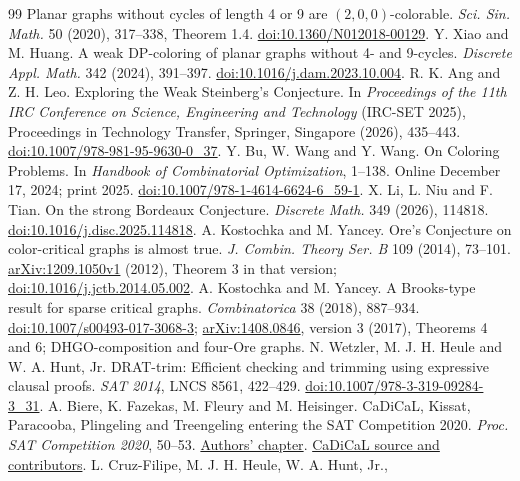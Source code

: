 \documentclass[11pt]{article}
\begin{document}
\begin{thebibliography}{99}
Planar graphs without cycles of length 4 or 9 are $(2,0,0)$-colorable.
\emph{Sci. Sin. Math.} 50 (2020), 317--338, Theorem 1.4.
\href{https://doi.org/10.1360/N012018-00129}{doi:10.1360/N012018-00129}.
 Y. Xiao and M. Huang.
A weak DP-coloring of planar graphs without 4- and 9-cycles.
\emph{Discrete Appl. Math.} 342 (2024), 391--397.
\href{https://doi.org/10.1016/j.dam.2023.10.004}{doi:10.1016/j.dam.2023.10.004}.
 R. K. Ang and Z. H. Leo.
Exploring the Weak Steinberg's Conjecture.
In \emph{Proceedings of the 11th IRC Conference on Science, Engineering
and Technology} (IRC-SET 2025), Proceedings in Technology Transfer,
Springer, Singapore (2026), 435--443.
\href{https://doi.org/10.1007/978-981-95-9630-0_37}{doi:10.1007/978-981-95-9630-0\_37}.
 Y. Bu, W. Wang and Y. Wang.
On Coloring Problems. In \emph{Handbook of Combinatorial Optimization},
1--138. Online December 17, 2024; print 2025.
\href{https://doi.org/10.1007/978-1-4614-6624-6_59-1}{doi:10.1007/978-1-4614-6624-6\_59-1}.
 X. Li, L. Niu and F. Tian.
On the strong Bordeaux Conjecture.
\emph{Discrete Math.} 349 (2026), 114818.
\href{https://doi.org/10.1016/j.disc.2025.114818}{doi:10.1016/j.disc.2025.114818}.
 A. Kostochka and M. Yancey.
Ore's Conjecture on color-critical graphs is almost true.
\emph{J. Combin. Theory Ser. B} 109 (2014), 73--101.
\href{https://arxiv.org/abs/1209.1050v1}{arXiv:1209.1050v1} (2012), Theorem 3 in that version;
\href{https://doi.org/10.1016/j.jctb.2014.05.002}{doi:10.1016/j.jctb.2014.05.002}.
 A. Kostochka and M. Yancey.
A Brooks-type result for sparse critical graphs.
\emph{Combinatorica} 38 (2018), 887--934.
\href{https://doi.org/10.1007/s00493-017-3068-3}{doi:10.1007/s00493-017-3068-3};
\href{https://arxiv.org/abs/1408.0846v3}{arXiv:1408.0846}, version 3 (2017),
Theorems 4 and 6; DHGO-composition and four-Ore graphs.
 N. Wetzler, M. J. H. Heule and W. A. Hunt, Jr.
DRAT-trim: Efficient checking and trimming using expressive clausal proofs.
\emph{SAT 2014}, LNCS 8561, 422--429.
\href{https://doi.org/10.1007/978-3-319-09284-3_31}{doi:10.1007/978-3-319-09284-3\_31}.
 A. Biere, K. Fazekas, M. Fleury and M. Heisinger.
CaDiCaL, Kissat, Paracooba, Plingeling and Treengeling entering the
SAT Competition 2020. \emph{Proc. SAT Competition 2020}, 50--53.
\href{https://fmv.jku.at/papers/BiereFazekasFleuryHeisinger-SAT-Competition-2020-solvers.pdf}{Authors' chapter}.
\href{https://github.com/arminbiere/cadical}{CaDiCaL source and contributors}.
 L. Cruz-Filipe, M. J. H. Heule, W. A. Hunt, Jr.,

\end{thebibliography}
\end{document}
